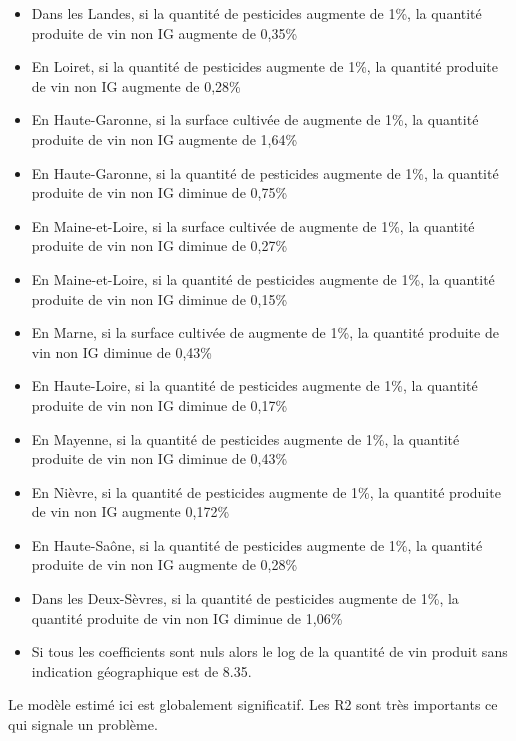 \documentclass[11pt, a4paper]{article}
\begin{document}
\begin{itemize}
    \item Dans les Landes, si la quantité de pesticides augmente de 1\%, la quantité produite de vin non IG augmente de 0,35\%
    \item En Loiret, si la quantité de pesticides augmente de 1\%, la quantité produite de vin non IG augmente de 0,28\%
    \item En Haute-Garonne, si la surface cultivée de augmente de 1\%, la quantité produite de vin non IG augmente de 1,64\%
    \item En Haute-Garonne, si la quantité de pesticides augmente de 1\%, la quantité produite de vin non IG diminue de 0,75\%
    \item En Maine-et-Loire, si la surface cultivée de augmente de 1\%, la quantité produite de vin non IG diminue de 0,27\%
    \item En Maine-et-Loire, si la quantité de pesticides augmente de 1\%, la quantité produite de vin non IG diminue de 0,15\%
    \item En Marne, si la surface cultivée de augmente de 1\%, la quantité produite de vin non IG diminue de 0,43\%
    \item En Haute-Loire, si la quantité de pesticides augmente de 1\%, la quantité produite de vin non IG diminue de 0,17\%
    \item En Mayenne, si la quantité de pesticides augmente de 1\%, la quantité produite de vin non IG diminue de 0,43\%
    \item En Nièvre, si la quantité de pesticides augmente de 1\%, la quantité produite de vin non IG augmente 0,172\%
    \item En Haute-Saône, si la quantité de pesticides augmente de 1\%, la quantité produite de vin non IG augmente de 0,28\%
    \item  Dans les Deux-Sèvres, si la quantité de pesticides augmente de 1\%, la quantité produite de vin non IG diminue de 1,06\%
    \item Si tous les coefficients sont nuls alors le log de la quantité de vin produit sans indication géographique est de 8.35.
\end{itemize}
Le modèle estimé ici est globalement significatif.
Les R2 sont très importants ce qui signale un problème.
\end{document}
